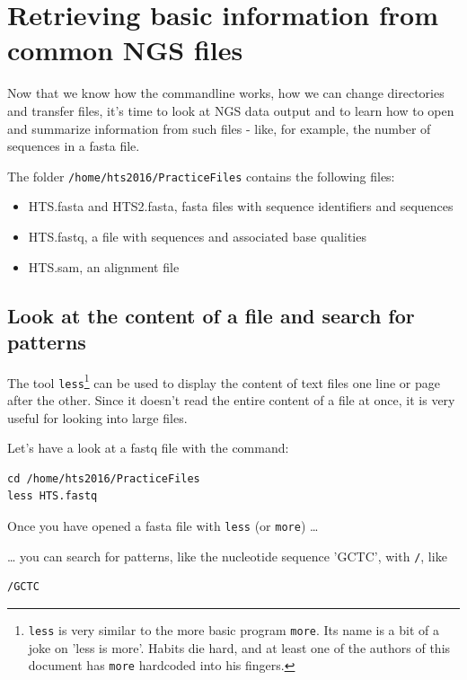 \documentclass[11pt]{article}
\begin{document}
\section{Retrieving basic information from common NGS files}
\label{sec:orgheadline25}

Now that we know how the commandline works, how we can change
directories and transfer files, it's time to look at NGS data output
and to learn how to open and summarize information from such files -
like, for example, the number of sequences in a fasta file.

The folder \texttt{/home/hts2016/PracticeFiles} contains the following files:
\begin{itemize}
\item HTS.fasta and HTS2.fasta, fasta files with sequence identifiers and sequences
\item HTS.fastq, a file with sequences and associated base qualities
\item HTS.sam, an alignment file
\end{itemize}

\subsection{Look at the content of a file and search for patterns}
\label{sec:orgheadline20}
The tool \texttt{less}\footnote{\texttt{less} is very similar to the more basic program \texttt{more}. Its
name is a bit of a joke on 'less is more'. Habits die hard, and at
least one of the authors of this document has \texttt{more} hardcoded into
his fingers.} can be used to display the content of text
files one line or page after the other. Since it doesn't read the
entire content of a file at once, it is very useful for looking into
large files.


Let's have a look at a fastq file with the command:

\begin{verbatim}
cd /home/hts2016/PracticeFiles
less HTS.fastq
\end{verbatim}

Once you have opened a fasta file with \texttt{less} (or \texttt{more}) \ldots{}

\ldots{} you can search for patterns, like the nucleotide sequence 'GCTC', with \texttt{/}, like

\begin{verbatim}
/GCTC
\end{verbatim}
\end{document}
